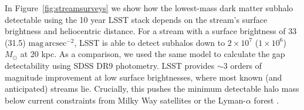 
In Figure~\ref{fig:streamsurveys} we show how the lowest-mass dark matter subhalo detectable using the 10 year LSST stack depends on the stream's surface brightness and heliocentric distance. For a stream with a surface brightness of 33 (31.5) $\mathrm{mag}\,\mathrm{arcsec}^{-2}$, LSST is able to detect subhalos down to $2 \times 10^7$ ($1 \times10^6$) $M_\odot$ at 20 kpc. As a comparison, we used the same model to calculate the gap detectability using SDSS DR9 photometry. LSST provides $\sim 3$ orders of magnitude improvement at low surface brightnesses, where most known (and anticipated) streams lie. Crucially, this pushes the minimum detectable halo mass below current constraints from Milky Way satellites \citep[\eg,][]{Jethwa:2018,Kim:2017iwr} or the Lyman-$\alpha$ forest \citep[\eg,][]{2017PhRvD..96b3522I}.

